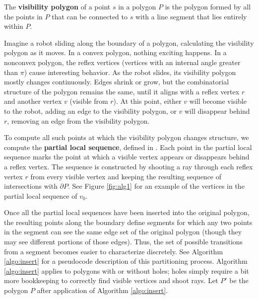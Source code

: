 \documentclass[]{styles/svproc}  %
\begin{document}
\begin{definition}
The \textbf{visibility polygon} of a point $s$ in a polygon $P$ is the polygon
formed by all the points in $P$ that can be connected to $s$ with a line
segment that lies entirely within $P$.
\end{definition}

Imagine a robot sliding along the boundary of a polygon, calculating 
the visibility polygon as it moves. In a convex polygon, nothing exciting 
happens. In a nonconvex polygon, the reflex vertices (vertices with an
internal angle greater than $\pi$) cause interesting
behavior.
As the robot slides, its visibility polygon mostly changes continuously. Edges
shrink or grow, but the combinatorial structure of the polygon remains the same,
until it aligns with a reflex vertex $r$ and another vertex $v$ (visible
from $r$). At this point, either 
$v$ will become visible to the robot, adding an edge to the visibility 
polygon, or $v$ will disappear behind $r$, removing an edge from the visibility polygon.

To compute all such points at which the visibility polygon changes structure, we
 compute the \textbf{partial local sequence}, defined in \cite{rourke_viz}.
Each point in the partial local sequence marks the point
at which a visible vertex appears or disappears behind a reflex vertex.
The sequence is constructed by shooting a ray through each reflex vertex $r$ from every
visible vertex and keeping the resulting sequence of intersections with
$\partial P$. See Figure \ref{fig:alg1} for an
example of the vertices in the partial local sequence of $v_0$. 

Once all the partial local sequences have been inserted into the original
polygon, the resulting points along the boundary define segments for which 
any two points in the segment can see the same edge set of the
original polygon (though they may see different portions of those edges).
Thus, the set of possible transitions from a segment becomes easier to
characterize discretely. See Algorithm \ref{algo:insert} for a pseudocode
description of this partitioning process. Algorithm
\ref{algo:insert} applies to polygons with or without holes; holes simply
require a bit more bookkeeping to correctly find visible vertices and shoot
rays. Let $P'$ be the polygon $P$ after application of Algorithm
\ref{algo:insert}.
\end{document}
